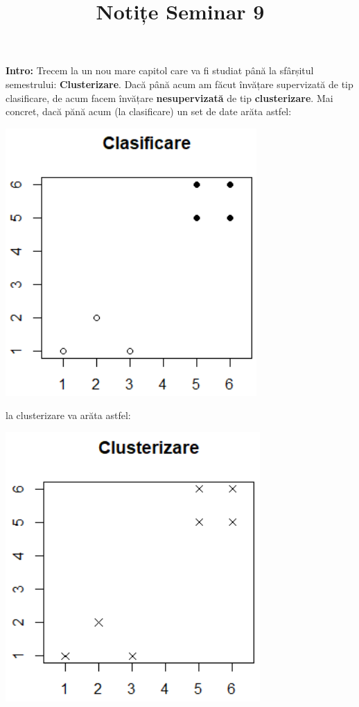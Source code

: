 \documentclass[12pt]{article}
\title{%
	\textbf{Notițe Seminar 9}}
\begin{document}
	
	\maketitle
	
	\textbf{{Intro:}} Trecem la un nou mare capitol care va fi studiat până la sfârșitul semestrului: \textbf{Clusterizare}. Dacă până acum am făcut învățare supervizată de tip clasificare, de acum facem învățare \textbf{nesupervizată} de tip \textbf{clusterizare}. Mai concret, dacă pănă acum (la clasificare) un set de date arăta astfel:
	\begin{center}
		\includegraphics{screenshot001}
	\end{center}
	
	\noindent la clusterizare va arăta astfel:
	\begin{center}
		\includegraphics{screenshot002}
	\end{center}
	
\end{document}
